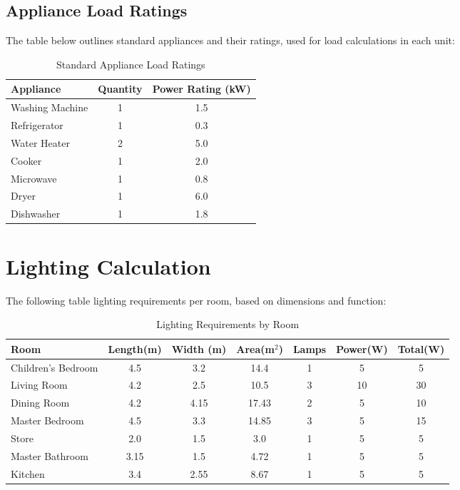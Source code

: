 \documentclass[a4paper,12pt]{article}
\begin{document}
\subsection{Appliance Load Ratings}
The table below outlines standard appliances and their ratings, used for load calculations in each unit:
\begin{table}[h]
    \centering
    \begin{tabular}{|l|c|c|}
        \toprule
        \textbf{Appliance} & \textbf{Quantity} & \textbf{Power Rating (kW)} \\
        \midrule
        Washing Machine & 1 & 1.5 \\
        Refrigerator & 1 & 0.3 \\
        Water Heater & 2 & 5.0 \\
        Cooker & 1 & 2.0 \\
        Microwave & 1 & 0.8 \\
        Dryer & 1 & 6.0 \\
        Dishwasher & 1 & 1.8 \\
        \bottomrule
    \end{tabular}
    \caption{Standard Appliance Load Ratings}
\end{table}

\section{Lighting Calculation}
The following table 
\hlinedetails lighting requirements per room, based on dimensions and function:
\begin{table}[htbp]
    \centering
    \begin{tabular}{|l|c|c|c|c|c|c|}
        \hline
        \textbf{Room} & \textbf{Length(m)} & \textbf{Width (m)} & \textbf{Area(m$^2$)} & \textbf{Lamps} & \textbf{Power(W)} & \textbf{Total(W)} \\
        \hline
        Children’s Bedroom & 4.5 & 3.2 & 14.4 & 1 & 5 & 5 \\
        Living Room & 4.2 & 2.5 & 10.5 & 3 & 10 & 30 \\
        Dining Room & 4.2 & 4.15 & 17.43 & 2 & 5 & 10 \\
        Master Bedroom & 4.5 & 3.3 & 14.85 & 3 & 5 & 15 \\
        Store & 2.0 & 1.5 & 3.0 & 1 & 5 & 5 \\
        Master Bathroom & 3.15 & 1.5 & 4.72 & 1 & 5 & 5 \\
        Kitchen & 3.4 & 2.55 & 8.67 & 1 & 5 & 5 \\
        \hline
    \end{tabular}
    \caption{Lighting Requirements by Room}
\end{table}
\end{document}
